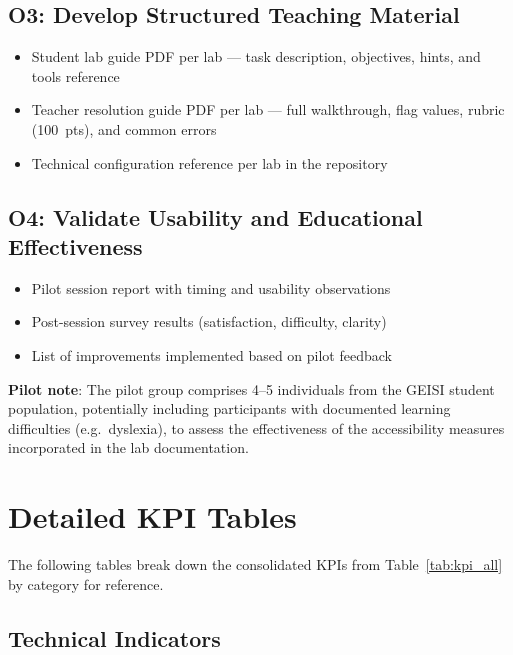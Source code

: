 \subsection{O3: Develop Structured Teaching Material}

\begin{itemize}
\item Student lab guide PDF per lab --- task description, objectives,
      hints, and tools reference
\item Teacher resolution guide PDF per lab --- full walkthrough,
      flag values, rubric (100~pts), and common errors
\item Technical configuration reference per lab in the repository
\end{itemize}

\subsection{O4: Validate Usability and Educational Effectiveness}

\begin{itemize}
\item Pilot session report with timing and usability observations
\item Post-session survey results (satisfaction, difficulty, clarity)
\item List of improvements implemented based on pilot feedback
\end{itemize}

\textbf{Pilot note}: The pilot group comprises 4--5 individuals from the GEISI student
population, potentially including participants with documented learning difficulties
(e.g.\ dyslexia), to assess the effectiveness of the accessibility measures
incorporated in the lab documentation.

\section{Detailed KPI Tables}

The following tables break down the consolidated KPIs from Table~\ref{tab:kpi_all}
by category for reference.

\subsection{Technical Indicators}

